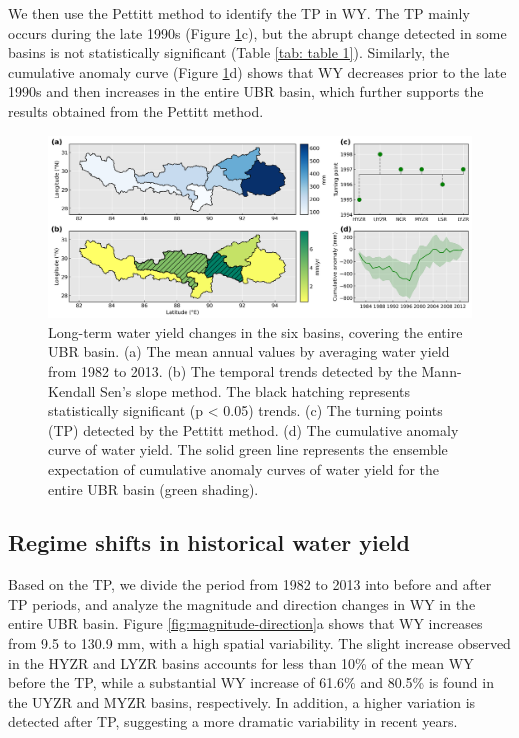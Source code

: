 \documentclass[hess, manuscript]{copernicus}
\begin{document}
We then use the Pettitt method to identify the TP in WY. The TP mainly occurs during the late 1990s (Figure \ref{fig:water-yield}c), but the abrupt change detected in some basins is not statistically significant (Table \ref{tab: table 1}). 
Similarly, the cumulative anomaly curve (Figure \ref{fig:water-yield}d) shows that WY decreases prior to the late 1990s and then increases in the entire UBR basin, which further supports the results obtained from the Pettitt method.

\begin{figure}[ht]
    \includegraphics[width=12cm]{02-figures/spatial-changes-in-water-yield.png}
    \caption{Long-term water yield changes in the six basins, covering the entire UBR basin.
    (a) The mean annual values by averaging water yield from 1982 to 2013. (b) The temporal trends detected by the Mann-Kendall Sen’s slope method. The black hatching represents statistically significant (p < 0.05) trends. (c) The turning points (TP) detected by the Pettitt method. (d) The cumulative anomaly curve of water yield. The solid green line represents the ensemble expectation of cumulative anomaly curves of water yield for the entire UBR basin (green shading).}
    \label{fig:water-yield}
\end{figure}

\subsection{Regime shifts in historical water yield}
Based on the TP, we divide the period from 1982 to 2013 into before and after TP periods, and analyze the magnitude and direction changes in WY in the entire UBR basin. 
Figure \ref{fig:magnitude-direction}a shows that WY increases from 9.5 to 130.9 mm, with a high spatial variability. 
The slight increase observed in the HYZR and LYZR basins accounts for less than 10\% of the mean WY before the TP, while a substantial WY increase of 61.6\% and 80.5\% is found in the UYZR and MYZR basins, respectively. 
In addition, a higher variation is detected after TP, suggesting a more dramatic variability in recent years.
\end{document}
